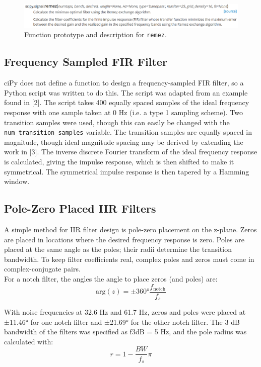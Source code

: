 \documentclass[12pt]{article}
\begin{document}
\begin{figure}[H]
    \centering
    \includegraphics[width=\textwidth]{remez.png}
    \caption{Function prototype and description for \texttt{remez}.}
    \label{fig:remez}
\end{figure}

\subsection{Frequency Sampled FIR Filter}
ciPy does not define a function to design a frequency-sampled FIR filter, so a Python script was written to do this. The script was adapted from an example found in [2].
The script takes 400 equally spaced samples of the ideal frequency response with one sample taken at 0 Hz (i.e. a type 1 sampling scheme). Two transition samples were used,
though this can easily be changed with the \texttt{num\_transition\_samples} variable. The transition samples are equally spaced in magnitude, though ideal magnitude spacing may be
derived by extending the work in [3]. The inverse discrete Fourier transform of the ideal frequency response is calculated, giving the impulse response, which is then
shifted to make it symmetrical. The symmetrical impulse response is then tapered by a Hamming window.

\subsection{Pole-Zero Placed IIR Filters}
A simple method for IIR filter design is pole-zero placement on the z-plane. Zeros are placed in locations where the desired frequency response is zero. Poles are placed at
the same angle as the poles; their radii determine the transition bandwidth. To keep filter coefficients real, complex poles and zeros must come in complex-conjugate pairs.\\

\noindent For a notch filter, the angles the angle to place zeros (and poles) are:
\begin{equation}
    \textrm{arg}(z) = \pm \ang{360} \frac{f_{\textrm{notch}}}{f_s}
\end{equation}

\noindent With noise frequencies at 32.6 Hz and 61.7 Hz, zeros and poles were placed at ±11.46° for one notch filter and ±21.69° for the other notch filter. The 3 dB bandwidth of the
filters was specified as f3dB = 5 Hz, and the pole radius was calculated with:
\begin{equation}
    r = 1 - \frac{BW}{f_s}\pi
\end{equation}
\end{document}

